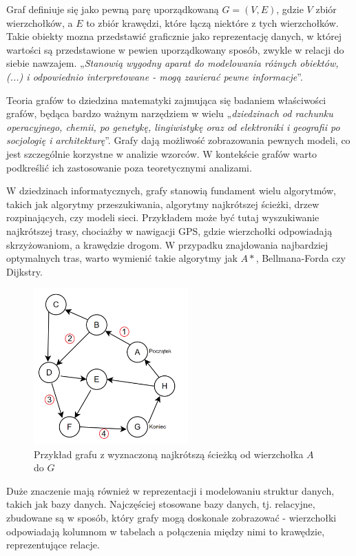 Graf definiuje się jako pewną parę uporządkowaną $G = (V, E)$, gdzie $V$ zbiór wierzchołków,
a $E$ to zbiór krawędzi, które łączą niektóre z tych wierzchołków.
Takie obiekty mozna przedstawić graficznie jako reprezentację danych,
w której wartości są przedstawione w pewien uporządkowany sposób, zwykle w relacji do siebie nawzajem.
„\textit{Stanowią wygodny aparat do modelowania różnych obiektów, (...) i odpowiednio interpretowane
- mogą zawierać pewne informacje}”\cite{Wloch2008}.

Teoria grafów to dziedzina matematyki zajmująca się badaniem właściwości grafów,
będąca bardzo ważnym narzędziem w wielu „\textit{dziedzinach od rachunku operacyjnego, chemii, po genetykę, lingiwistykę
oraz od elektroniki i geografii po socjologię i architekturę}”\cite{Wilson2012}.
Grafy dają możliwość zobrazowania pewnych modeli, co jest szczególnie korzystne w analizie wzorców.
W kontekście grafów warto podkreślić ich zastosowanie poza teoretycznymi analizami.

W dziedzinach informatycznych, grafy stanowią fundament wielu algorytmów, takich jak algorytmy przeszukiwania,
algorytmy najkrótszej ścieżki, drzew rozpinających, czy modeli sieci.
Przykładem może być tutaj wyszukiwanie najkrótszej trasy, chociażby w nawigacji GPS,
gdzie wierzchołki odpowiadają skrzyżowaniom, a krawędzie drogom.
W przypadku znajdowania najbardziej optymalnych tras, warto wymienić takie algorytmy jak $A*$, Bellmana-Forda czy Dijkstry.

\begin{figure}[ht]
	\centering
	\includegraphics[height=6cm]{partials/images/intro_shortest_path.png}
	\caption{Przykład grafu z wyznaczoną najkrótszą ścieżką od wierzchołka $A$ do $G$}
    \label{Fig:intro-1}
\end{figure}

Duże znaczenie mają również w reprezentacji i modelowaniu struktur danych, takich jak bazy danych.
Najczęściej stosowane bazy danych, tj. relacyjne, zbudowane są w sposób, który grafy mogą doskonale zobrazować -
wierzchołki odpowiadają kolumnom w tabelach a połączenia między nimi to krawędzie, reprezentujące relacje.

